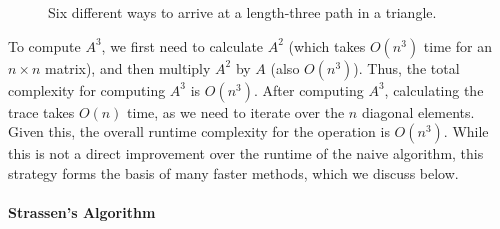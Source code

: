 \documentclass[11pt, margin=1in]{article}
\begin{document}
\begin{figure}[H]
\begin{subfigure}{0.15\textwidth}
    \end{subfigure}
    \begin{subfigure}{0.15\textwidth}
        \centering
    \end{subfigure}
    \begin{subfigure}{0.15\textwidth}
        \centering
    \end{subfigure}
    \caption{Six different ways to arrive at a length-three path in a triangle.}
    \label{fig:triangle-traversal}
\end{figure}

To compute $A^3$, we first need to calculate $A^2$ (which takes $O(n^3)$ time for an $n \times n$ matrix), and then multiply $A^2$ by $A$ (also $O(n^3)$).
Thus, the total complexity for computing $A^3$ is $O(n^3)$.
After computing $A^3$, calculating the trace takes $O(n)$ time, as we need to iterate over the $n$ diagonal elements.
Given this, the overall runtime complexity for the operation is $O(n^3)$.
While this is not a direct improvement over the runtime of the naive algorithm, this strategy forms the basis of many faster methods, which we discuss below.

\paragraph{Strassen's Algorithm}
\end{document}
